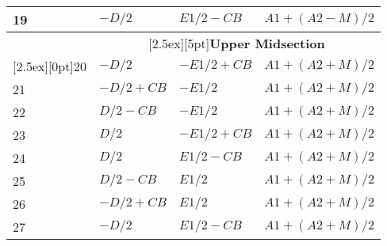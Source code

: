 \documentclass[a4paper, dvipdfm]{article}
\begin{document}
\begin{longtable}{|l|l|l|l|}
19 & $-D/2$      & $E1/2-CB$           & $A1+(A2-M)/2$\\
\hline
&\multicolumn{3}{|c|}{\raisebox{0pt}[2.5ex][5pt]{\textbf{Upper Midsection}}}\\\cline{2-4}
\raisebox{0pt}[2.5ex][0pt]{20}
   & $-D/2$      & $-E1/2+CB$          & $A1+(A2+M)/2$\\
21 & $-D/2+CB$   & $-E1/2$             & $A1+(A2+M)/2$\\
22 & $D/2-CB$    & $-E1/2$             & $A1+(A2+M)/2$\\
23 & $D/2$       & $-E1/2+CB$          & $A1+(A2+M)/2$\\
24 & $D/2$       & $E1/2-CB$           & $A1+(A2+M)/2$\\
25 & $D/2-CB$    & $E1/2$              & $A1+(A2+M)/2$\\
26 & $-D/2+CB$   & $E1/2$              & $A1+(A2+M)/2$\\
27 & $-D/2$      & $E1/2-CB$           & $A1+(A2+M)/2$\\


\end{longtable}
\end{document}
